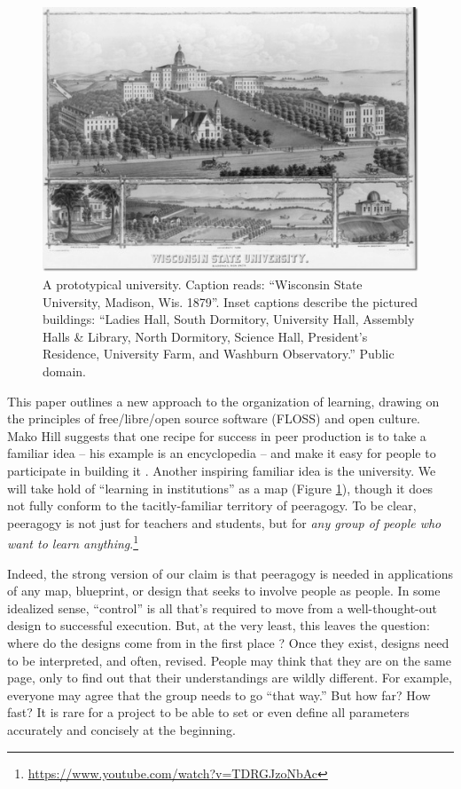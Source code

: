 \begin{refsection}
\begin{figure}
\begin{center}
\includegraphics[width=.9\textwidth,trim=0 30 10 2, clip=true]{wisconsin-map}
\end{center}
\caption{A prototypical university.  Caption reads: ``Wisconsin State
  University, Madison, Wis. 1879''.  Inset captions describe the
  pictured buildings: ``Ladies Hall, South Dormitory, University Hall,
  Assembly Halls \& Library, North Dormitory, Science Hall, President's
  Residence, University Farm, and Washburn Observatory.''  Public
  domain.\label{madison-map}}
\end{figure} 

This paper outlines a new approach to the organization of learning, drawing on the principles of free/libre/open source software (FLOSS) and open culture.  Mako Hill suggests that one recipe for success in peer production is to take a familiar idea -- his example is an encyclopedia -- and make it easy for people to participate in building it \cite[Chapter 1]{mako-thesis}.  Another inspiring familiar idea is the university.  We will take hold of ``learning in institutions'' as a map (Figure \ref{madison-map}), though it does not fully conform to the tacitly-familiar territory of peeragogy.  To be clear, peeragogy is not just for teachers and students, but for \emph{any group of people who want to learn anything}.\footnote{\url{https://www.youtube.com/watch?v=TDRGJzoNbAc}}

Indeed, the strong version of our claim is that peeragogy is needed in applications of any map, blueprint, or design that seeks to involve people as people.  In some idealized sense, ``control'' is all that's required to move from a well-thought-out design to successful execution.  But, at the very least, this leaves the question: where do the designs come from in the first place \cite{von2003cybernetics}?
%
Once they exist, designs need to be interpreted, and often, revised.  People may think that they are on the same page, only to find out that their understandings are wildly different.  For  example, everyone may agree that the group needs to go ``that way.''  But how far?  How fast?  It is rare for a project to be able to set or even define all parameters accurately and concisely at the beginning.


\end{refsection}

